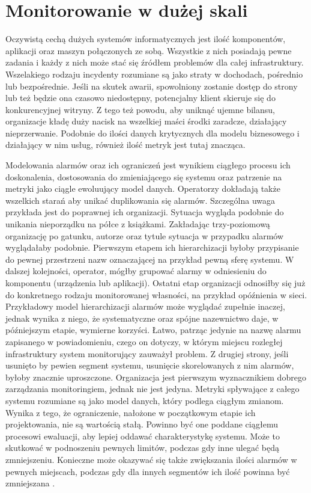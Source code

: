 \section{Monitorowanie w dużej skali}
\label{chapters:monitoring:at_scale}

Oczywistą cechą dużych systemów informatycznych jest ilość komponentów, aplikacji oraz maszyn połączonych ze sobą.
Wszystkie z nich posiadają pewne zadania i każdy z nich może stać się źródłem problemów dla całej infrastruktury. 
Wszelakiego rodzaju incydenty rozumiane są jako straty w dochodach, pośrednio lub bezpośrednie. Jeśli na skutek 
awarii, spowolniony zostanie dostęp do strony lub też będzie ona czasowo niedostępny, potencjalny klient
skieruje się do konkurencyjnej witryny. Z tego też powodu, aby uniknąć ujemne bilansu, organizacje kładę duży nacisk
na wszelkiej maści środki zaradcze, działający nieprzerwanie. Podobnie do ilości danych krytycznych dla modelu 
biznesowego i działający w nim usług, również ilość metryk jest tutaj znacząca.

Modelowania alarmów oraz ich ograniczeń jest wynikiem ciągłego procesu ich doskonalenia, dostosowania do zmieniającego
się systemu oraz patrzenie na metryki jako ciągle ewoluujący model danych.
Operatorzy dokładają także wszelkich starań aby unikać duplikowania się alarmów. Szczególna uwaga
przykłada jest do poprawnej ich organizacji. Sytuacja wygląda podobnie do unikania nieporządku na półce z książkami.
Zakładając trzy-poziomową organizację po gatunku, autorze oraz tytule sytuacja w przypadku alarmów wyglądałaby podobnie.
Pierwszym etapem ich hierarchizacji byłoby przypisanie do pewnej przestrzeni nazw oznaczającej na przykład
pewną sferę systemu. W dalszej kolejności, operator, mógłby grupować alarmy w odniesieniu do komponentu (urządzenia lub aplikacji).
Ostatni etap organizacji odnosiłby się już do konkretnego rodzaju monitorowanej własności, na przykład opóźnienia w sieci.
Przykładowy model hierarchizacji alarmów może wyglądać zupełnie inaczej, jednak wynika z niego, że systematyczne oraz spójne
nazewnictwo daje, w późniejszym etapie, wymierne korzyści. Łatwo, patrząc jedynie na nazwę alarmu zapisanego w powiadomieniu, 
czego on dotyczy, w którym miejscu rozległej infrastruktury system monitorujący zauważył problem. Z drugiej strony, jeśli
usunięto by pewien segment systemu, usunięcie skorelowanych z nim alarmów, byłoby znacznie uproszczone.
Organizacja jest pierwszym wyznacznikiem dobrego zarządzania monitoringiem, jednak nie jest jedyna. Metryki spływające
z całego systemu rozumiane są jako model danych, który podlega ciągłym zmianom. Wynika z tego, że ograniczenie, nałożone w początkowym
etapie ich projektowania, nie są wartością stałą. Powinno być one poddane ciągłemu procesowi ewaluacji, aby lepiej 
oddawać charakterystykę systemu. Może to skutkować w podnoszeniu pewnych limitów, podczas gdy inne ulegać będą zmniejszeniu. Konieczne 
może okazywać się także zwiększania ilości alarmów w pewnych miejscach, podczas gdy dla innych 
segmentów ich ilość powinna być zmniejszana \cite{monitoring_and_alerting}.